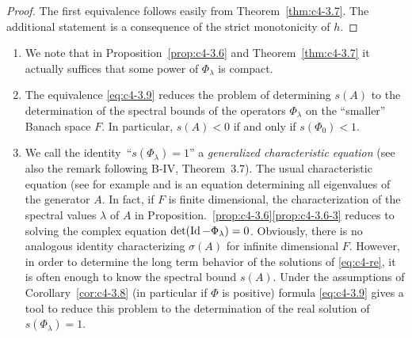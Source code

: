 \begin{proof}
The first equivalence follows easily from Theorem~\ref{thm:c4-3.7}. 
The additional statement is a consequence of the strict monotonicity of $h$.
\end{proof}
\begin{remarks*}\label{rem:c4-3.0-kgk}
%
%
\begin{enumerate}[\upshape (i), wide, labelindent=.5em] 
\item \label{rem:c4-3.1-1}
We note that in Proposition~\ref{prop:c4-3.6} and Theorem~\ref{thm:c4-3.7} it actually suffices that some power of $\Phi_{\lambda}$ is compact.

\item \label{rem:c4-3.1-2}
The equivalence \eqref{eq:c4-3.9} reduces the problem of determining $s(A)$ to the determination of the spectral bounds of the operators $\Phi_{\lambda}$ on the \enquote{smaller} Banach space $F$.
In particular, $s(A) < 0$ if and only if $s(\Phi_{0}) < 1$.

\item \label{rem:c4-3.1-3}
We call the identity\, \enquote{$s(\Phi_{\lambda}) = 1$} a \emph{generalized characteristic equation} (see also the remark following B-IV, Theorem~3.7). The usual characteristic equation (see for example  \citet[p.168ff]{hale:1977} and \citet[Section~5]{heijmans:1985b}
is an equation determining all eigenvalues of the generator $A$. 
In fact, if $F$ is finite dimensional, the characterization of the spectral values $\lambda$ of $A$ in Proposition.~\ref{prop:c4-3.6}\ref{prop:c4-3.6-3} reduces to solving the complex equation $\det(\operatorname{Id} - \Phi_{\lambda}) = 0$. 
Obviously, there is no analogous identity characterizing $\sigma(A)$ for infinite dimensional $F$. 
However, in order to determine the long term behavior of the solutions of \eqref{eq:c4-re}, it is often enough to know the spectral bound $s(A)$. 
Under the assumptions of Corollary~\ref{cor:c4-3.8} (in particular if $\Phi$ is positive) formula \eqref{eq:c4-3.9} gives a tool to reduce this problem to the determination of the real solution of $s(\Phi_{\lambda}) = 1$.
\end{enumerate}
\end{remarks*}
